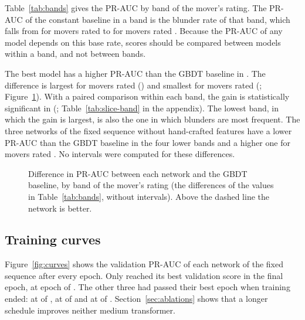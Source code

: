 \documentclass[11pt]{article}
\begin{document}
Table~\ref{tab:bands} gives the PR-AUC by band of the mover's rating. The
PR-AUC of the constant baseline in a band is the blunder rate of that band,
which falls from  for movers rated  to
 for movers rated . Because the PR-AUC of any
model depends on this base rate, scores should be compared between models
within a band, and not between bands.

\begin{table}[htbp]\centering\small
{}
\caption{Test PR-AUC by band of the mover's rating. The base rate of blunders
differs between bands, so values are comparable within a column and not
between columns.}
\label{tab:bands}
\end{table}

The best model has a higher PR-AUC than the GBDT baseline in
. The difference is largest for movers rated
 () and smallest for movers
rated  (;
Figure~\ref{fig:bands}).\iflook{} With a paired comparison within each band,
the gain is statistically significant in 
(; Table~\ref{tab:slice-band} in the
appendix).\fi{} The lowest band, in which the gain is largest, is also the
one in which blunders are most frequent. The three networks of the fixed
sequence without hand-crafted features have a lower PR-AUC than the GBDT
baseline in the four lower bands and a higher one for movers rated
. No intervals were computed for these differences.

\begin{figure}[htbp]\centering
{}
\caption{Difference in PR-AUC between each network and the GBDT baseline, by
band of the mover's rating (the differences of the values in
Table~\ref{tab:bands}, without intervals). Above the dashed line the network
is better.}
\label{fig:bands}
\end{figure}

\subsection{Training curves}

Figure~\ref{fig:curves} shows the validation PR-AUC of each network of the
fixed sequence after every epoch. Only  reached its
best validation score in the final epoch, at epoch
 of .
The other three had passed their best epoch when training ended:
 at  of
,  at
 of  and
 at 
of .
\ifchangeepochs
Section~\ref{sec:ablations} shows that a longer schedule improves neither
medium transformer.
\fi
\end{document}
